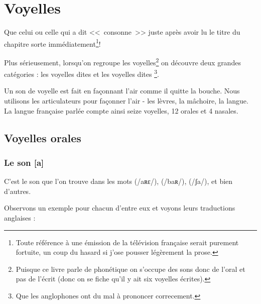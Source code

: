 \chapter{Voyelles}\label{chap:voy}
Que celui ou celle qui a dit <<~consonne~>> juste après avoir lu le
titre du chapitre sorte immédiatement\footnote{Toute référence à une
  émission de la télévision française serait purement fortuite, un
  coup du hasard si j'ose pousser légèrement la prose.}!\par
Plus sérieusement, lorsqu'on regroupe les voyelles\footnote{Puisque ce
  livre parle de phonétique on s'occupe des sons donc de l'oral et pas
  de l'écrit (donc on se fiche qu'il y ait six voyelles écrites).} on
découvre deux grandes catégories : les voyelles dites  et
les voyelles dites \footnote{Que les anglophones ont du
  mal à prononcer correcement.}.

Un son de voyelle est fait en façonnant l'air comme il quitte la
bouche. Nous utilisons les articulateurs pour façonner l'air - les
lèvres, la mâchoire, la langue. La langue française parlée compte
ainsi seize voyelles, 12 orales et 4 nasales.

\section{Voyelles orales}\label{sec:orales}
\subsection{Le son [a]}\label{subsec:afr}

C'est le son que l'on trouve dans les mots  (/aʀɛ/),
 (/baʀ/),  (/ʃa/), et bien
d'autres. 

Observons un exemple pour chacun d'entre eux et voyons leurs
traductions anglaises :\par

